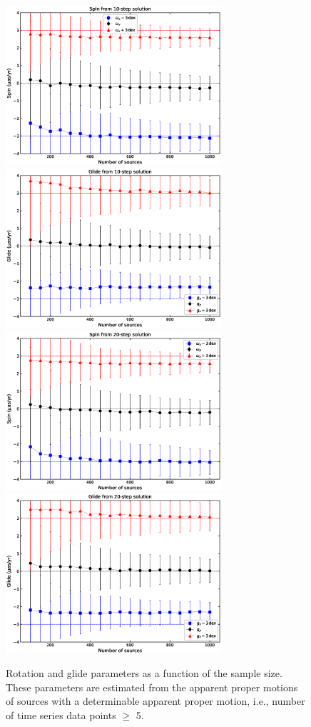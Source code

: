\documentclass{aa-note}    %
\begin{document}
\begin{figure}[hbtp]
   \includegraphics[width=80mm]{figs/spin-from-apm-nju-10step} 
   \includegraphics[width=80mm]{figs/glide-from-apm-nju-10step} \\
   \includegraphics[width=80mm]{figs/spin-from-apm-nju-20step} 
   \includegraphics[width=80mm]{figs/glide-from-apm-nju-20step}
   \caption[]{\label{fig:spin-glide-all} %
   Rotation and glide parameters as a function of the sample size.
   These parameters are estimated from the apparent proper motions of sources with a determinable apparent proper motion, i.e., number of time series data points $\ge$ 5.
   }
 \end{figure}
\end{document}
